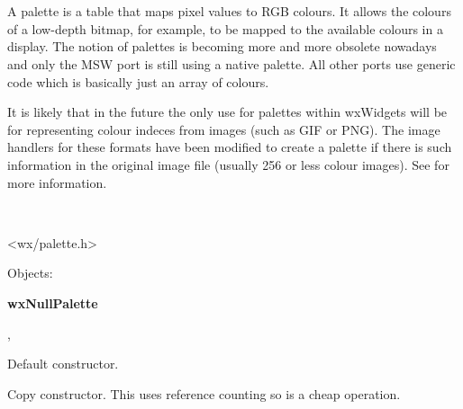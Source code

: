 
\section{}\label{wxpalette}

A palette is a table that maps pixel values to RGB colours. It allows the
colours of a low-depth bitmap, for example, to be mapped to the available
colours in a display. The notion of palettes is becoming more and more
obsolete nowadays and only the MSW port is still using a native palette.
All other ports use generic code which is basically just an array of
colours. 

It is likely that in the future the only use for palettes within wxWidgets
will be for representing colour indeces from images (such as GIF or PNG).
The image handlers for these formats have been modified to create a palette
if there is such information in the original image file (usually 256 or less
colour images). See  for more information.


\\


<wx/palette.h>


Objects:

{\bf wxNullPalette}


, 


\label{wxpalettector}


Default constructor.


Copy constructor. This uses reference counting so is a cheap operation.

